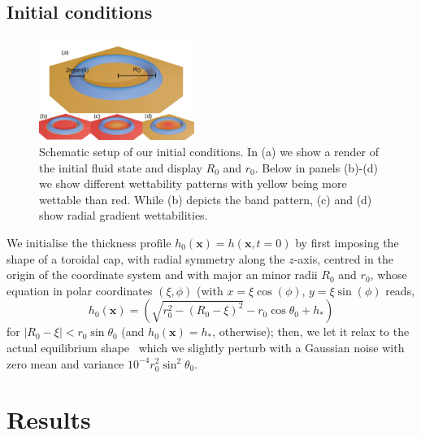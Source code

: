 \documentclass[twoside,twocolumn,9pt]{article}
\begin{document}
\subsection{Initial conditions}
\begin{figure}
\centering
  \includegraphics[width=0.45\textwidth]{New_fig1.png}
  \caption{Schematic setup of our initial conditions. In (a) we show a render of the initial fluid state and display $R_0$ and $r_0$. 
  Below in panels (b)-(d) we show different wettability patterns with yellow being more wettable than red.
  While (b) depicts the band pattern, (c) and (d) show radial gradient wettabilities.} 
  \label{fig:ringschema}
\end{figure}

We initialise the thickness profile $h_0(\mathbf{x})=h(\mathbf{x}, t=0)$ by first imposing the shape of a toroidal cap, with radial symmetry along the $z$-axis, centred in the origin of the coordinate system and with major an minor radii $R_0$ and $r_0$, whose equation in polar coordinates $(\xi, \phi)$ (with $x = \xi \cos(\phi)$, $y=\xi \sin(\phi)$ reads,
\begin{equation}\label{eq:torus}
h_0(\mathbf{x})=\left(\sqrt{r_0^2 - \left(R_0-\xi\right)^2} - r_0\cos \theta_0 + h_{\ast}\right)
\end{equation}
for $|R_0-\xi|<r_0 \sin \theta_0$ (and $h_0(\mathbf{x})=h_{\ast}$, otherwise); then, we let it relax to the actual equilibrium shape~\cite{diezBreakupFluidRivulets2009} which we slightly perturb with a Gaussian noise with zero mean and variance $10^{-4}r_0^2 \sin^2\theta_0$. 

\section{Results} \label{sec:results}
\end{document}
